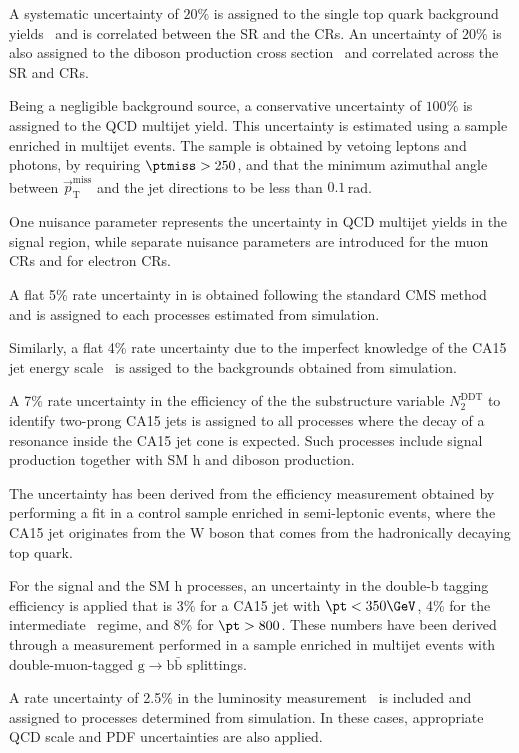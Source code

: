 A systematic uncertainty of $20\%$ is assigned to the single top quark background yields~\cite{Chatrchyan:1642680} and is correlated between the SR and the CRs. 
%
An uncertainty of $20\%$ is also assigned to the diboson production cross section~\cite{Khachatryan:2016txa,Khachatryan:2016tgp} and correlated across the SR and CRs.
%

Being a negligible background source, a conservative uncertainty of $100\%$ is assigned to the QCD multijet yield. 
%
This uncertainty is estimated using a sample enriched in multijet events. The sample is obtained by vetoing leptons and photons, by requiring $\ptmiss>250$\GeV, and that the minimum azimuthal angle between $\vec{p}_{\mathrm{T}}^{\mathrm{miss}}$ and the jet directions to be less than $0.1$\,rad.

One nuisance parameter represents the uncertainty in QCD multijet yields in the signal region, while separate nuisance parameters are introduced for the muon CRs and for electron CRs.

A flat 5\% rate uncertainty in \ptmiss is obtained following the standard CMS method~\cite{Khachatryan:2014gga} and is assigned to each processes estimated from simulation.

Similarly, a flat 4\% rate uncertainty due to the imperfect knowledge of the CA15 jet energy scale~\cite{jec} is assiged to the backgrounds obtained from simulation.

A 7\% rate uncertainty in the efficiency of the the substructure variable
$N_2^\text{DDT}$ to identify two-prong CA15 jets is assigned to all processes where the decay of a resonance inside the CA15 jet cone is expected. Such processes include signal production together with SM h and diboson production.  

The uncertainty has been derived from the efficiency measurement obtained by performing a fit in a control sample
enriched in semi-leptonic \ttbar events, where the CA15 jet originates
from the W boson that comes from the hadronically decaying top quark. 
%

For the signal and the SM h processes, an uncertainty in the double-b tagging efficiency is applied that is 3\% for a CA15 jet with $\pt<350\GeV$, 4\% for the intermediate \pt~regime, and 8\% for $\pt>800$\GeV. These numbers have been derived through a measurement performed in a sample enriched in multijet events with double-muon-tagged $\text{g}\to\text{b}\bar{\text{b}}$ splittings. 
%

A rate uncertainty of 2.5\% in the luminosity measurement~\cite{CMS-PAS-LUM-17-001} is included and assigned to processes determined from simulation. In these cases, appropriate QCD scale and PDF uncertainties are also applied.
%

